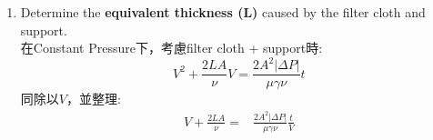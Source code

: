 \documentclass[12pt,a4paper]{article}
\begin{document}
\begin{problems}
\begin{enumerate}
    假設有1 kg slurry. 因為slurry含有50 wt\%固體:
    \begin{equation}
        m_s=0.5~\text{kg},\qquad m_f=0.5~\text{kg}
    \end{equation}
    固體體積:
    \begin{equation}
        V_s=\frac{m_s}{\rho_s}=\frac{0.5}{2500}=2.0\times10^{-4}~\text{m}^3
    \end{equation}
    Wet cake體積:\\
    因為cake中固體只占$(1-\varepsilon)$，所以
    \begin{equation}
        V_c=\frac{V_s}{1-\varepsilon}
        =\frac{2.0\times10^{-4}}{1-0.333}
        =3.0\times10^{-4}~\text{m}^3
    \end{equation}
    Cake 中保留的液體體積
    \begin{equation}
        V_{f,\text{in cake}}=\varepsilon V_c
        =(0.333)(3.0\times10^{-4})
        =1.0\times10^{-4}~\text{m}^3
    \end{equation}
    初始液體體積
    \begin{equation}
        V_{f,\text{initial}}=\frac{m_f}{\rho_f}=\frac{0.5}{1000}=5.0\times10^{-4}~\text{m}^3
    \end{equation}
    因此過濾掉的液體體積
    \begin{equation}
        V_{f,\text{filtered}}=V_{f,\text{initial}}-V_{f,\text{in cake}}=5.0\times10^{-4}-1.0\times10^{-4}=4.0\times10^{-4}~\text{m}^3
    \end{equation}
    因此每過濾掉1 m$^3$的液體，會形成的cake體積為
    \begin{equation}
        \nu=\frac{V_c}{V_{f,\text{filtered}}}=\frac{3.0\times10^{-4}}{4.0\times10^{-4}}=0.75~\text{m}^3_{\text{cake}}/\text{m}^3_{\text{filtrate}}
    \end{equation}
    \# Answer: \underline{$\nu=0.75~\text{m}^3_{\text{cake}}/\text{m}^3_{\text{filtrate}}$}
    \item Determine the \textbf{equivalent thickness ($\boldsymbol{L}$)} caused by the filter cloth and support.\\
    在Constant Pressure下，考慮filter cloth + support時:
    \begin{equation}
      V^2 + \frac{2LA}{\nu}V = \frac{2A^2\left|\Delta P\right|}{\mu\gamma\nu}t \label{eq8}
    \end{equation}
    同除以$V$，並整理:
    \begin{align}
      V  + \frac{2LA}{\nu} =& \frac{2A^2\left|\Delta P\right|}{\mu\gamma\nu}\frac{t}{V} \nonumber\\

\end{align}
\end{enumerate}
\end{problems}
\end{document}
